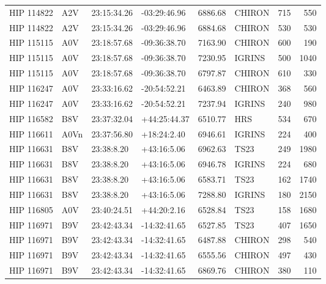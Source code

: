 \documentclass{emulateapj}
\begin{document}
\begin{longtable*}{|l|lllrlrr|}
  HIP 114822 &            A2V &    23:15:34.26 &   -03:29:46.96 &  6886.68 &     CHIRON &      715 &     550 \\
  HIP 114822 &            A2V &    23:15:34.26 &   -03:29:46.96 &  6884.68 &     CHIRON &      530 &     530 \\
  HIP 115115 &            A0V &    23:18:57.68 &   -09:36:38.70 &  7163.90 &     CHIRON &      600 &     190 \\
  HIP 115115 &            A0V &    23:18:57.68 &   -09:36:38.70 &  7230.95 &     IGRINS &      500 &    1040 \\
  HIP 115115 &            A0V &    23:18:57.68 &   -09:36:38.70 &  6797.87 &     CHIRON &      610 &     330 \\
  HIP 116247 &            A0V &    23:33:16.62 &   -20:54:52.21 &  6463.89 &     CHIRON &      368 &     560 \\
  HIP 116247 &            A0V &    23:33:16.62 &   -20:54:52.21 &  7237.94 &     IGRINS &      240 &     980 \\
  HIP 116582 &            B8V &    23:37:32.04 &   +44:25:44.37 &  6510.77 &        HRS &      534 &     670 \\
  HIP 116611 &           A0Vn &    23:37:56.80 &    +18:24:2.40 &  6946.61 &     IGRINS &      224 &     400 \\
  HIP 116631 &            B8V &     23:38:8.20 &    +43:16:5.06 &  6962.63 &       TS23 &      249 &    1980 \\
  HIP 116631 &            B8V &     23:38:8.20 &    +43:16:5.06 &  6946.78 &     IGRINS &      224 &     680 \\
  HIP 116631 &            B8V &     23:38:8.20 &    +43:16:5.06 &  6583.71 &       TS23 &      162 &    1740 \\
  HIP 116631 &            B8V &     23:38:8.20 &    +43:16:5.06 &  7288.80 &     IGRINS &      180 &    2150 \\
  HIP 116805 &            A0V &    23:40:24.51 &    +44:20:2.16 &  6528.84 &       TS23 &      158 &    1680 \\
  HIP 116971 &            B9V &    23:42:43.34 &   -14:32:41.65 &  6527.85 &       TS23 &      407 &    1650 \\
  HIP 116971 &            B9V &    23:42:43.34 &   -14:32:41.65 &  6487.88 &     CHIRON &      298 &     540 \\
  HIP 116971 &            B9V &    23:42:43.34 &   -14:32:41.65 &  6555.56 &     CHIRON &      497 &     430 \\
  HIP 116971 &            B9V &    23:42:43.34 &   -14:32:41.65 &  6869.76 &     CHIRON &      380 &     110 \\

\end{longtable*}
\end{document}
